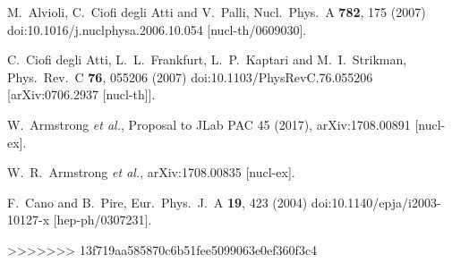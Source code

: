 \documentclass[twocolumn]{revtex4}
\begin{document}
\begin{thebibliography}{25}
  M.~Alvioli, C.~Ciofi degli Atti and V.~Palli,
  Nucl.\ Phys.\ A {\bf 782}, 175 (2007)
  doi:10.1016/j.nuclphysa.2006.10.054
  [nucl-th/0609030].

  C.~Ciofi degli Atti, L.~L.~Frankfurt, L.~P.~Kaptari and M.~I.~Strikman,
  Phys.\ Rev.\ C {\bf 76}, 055206 (2007)
  doi:10.1103/PhysRevC.76.055206
  [arXiv:0706.2937 [nucl-th]].

  W.~Armstrong {\it et al.},
  Proposal to JLab PAC 45 (2017),
  arXiv:1708.00891 [nucl-ex].

  W.~R.~Armstrong {\it et al.},
  arXiv:1708.00835 [nucl-ex].




  F.~Cano and B.~Pire,
  Eur.\ Phys.\ J.\ A {\bf 19}, 423 (2004)
  doi:10.1140/epja/i2003-10127-x
  [hep-ph/0307231].

\end{thebibliography}

>>>>>>> 13f719aa585870c6b51fee5099063e0ef360f3c4
\end{document}
